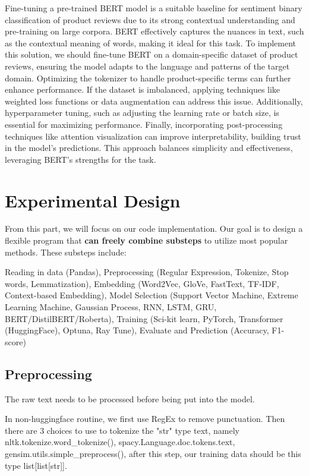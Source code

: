 \documentclass{article}
\begin{document}
\hypertarget{hpa.4}{{}}Fine-tuning a pre-trained BERT model is a suitable baseline for sentiment binary classification of product reviews due to its strong contextual understanding and pre-training on large corpora. BERT effectively captures the nuances in text, such as the contextual meaning of words, making it ideal for this task. To implement this solution, we should fine-tune BERT on a domain-specific dataset of product reviews, ensuring the model adapts to the language and patterns of the target domain. Optimizing the tokenizer to handle product-specific terms can further enhance performance. If the dataset is imbalanced, applying techniques like weighted loss functions or data augmentation can address this issue. Additionally, hyperparameter tuning, such as adjusting the learning rate or batch size, is essential for maximizing performance. Finally, incorporating post-processing techniques like attention visualization can improve interpretability, building trust in the model's predictions. This approach balances simplicity and effectiveness, leveraging BERT’s strengths for the task.

\section{Experimental Design}
From this part, we will focus on our code implementation. Our goal is to design a flexible program that \textbf{can freely combine substeps} to utilize most popular methods. These substeps include: 

Reading in data (Pandas), Preprocessing (Regular Expression, Tokenize, Stop words, Lemmatization), Embedding (Word2Vec, GloVe, FastText, TF-IDF, Context-based Embedding), Model Selection (Support Vector Machine, Extreme Learning Machine, Gaussian Process, RNN, LSTM, GRU, BERT/DistilBERT/Roberta), Training (Sci-kit learn, PyTorch, Transformer (HuggingFace), Optuna, Ray Tune), Evaluate and Prediction (Accuracy, F1-score)


\subsection{Preprocessing}
The raw text needs to be processed before being put into the model. 

In non-huggingface routine, we first use RegEx to remove punctuation. Then there are 3 choices to use to tokenize the "str" type text, namely nltk.tokenize.word\_tokenize(), spacy.Language.doc.tokens.text, gensim.utils.simple\_preprocess(), after this step, our training data should be this type list[list[str]].
\end{document}
